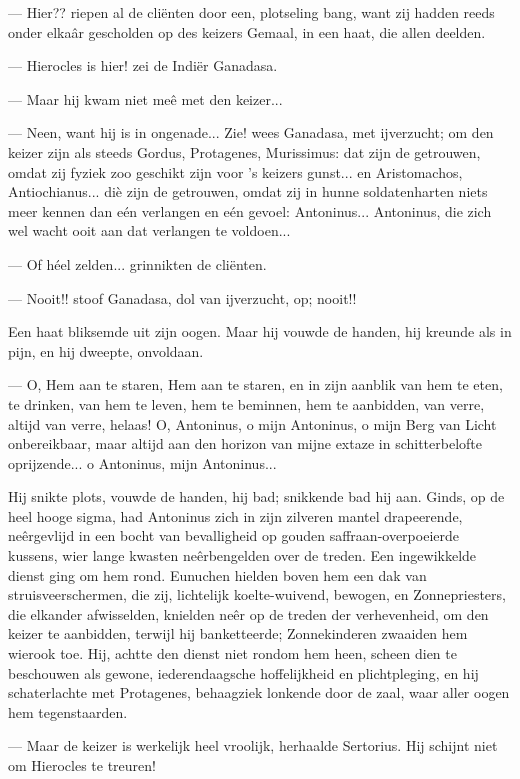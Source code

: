 \documentclass[a4paper, 12pt, oneside, dutch]{article}
\begin{document}
--- Hier?? riepen al de cliënten door een, plotseling bang, want zij hadden reeds onder elkaâr gescholden op des keizers Gemaal, in een haat, die allen deelden.

--- Hierocles is hier! zei de Indiër Ganadasa.

--- Maar hij kwam niet meê met den keizer...

--- Neen, want hij is in ongenade... Zie! wees Ganadasa, met ijverzucht; om den keizer zijn als steeds Gordus, Protagenes, Murissimus: dat zijn de getrouwen, omdat zij fyziek zoo geschikt zijn voor 's keizers gunst... en Aristomachos, Antiochianus... diè zijn de getrouwen, omdat zij in hunne soldatenharten niets meer kennen dan eén verlangen en eén gevoel: Antoninus... Antoninus, die zich wel wacht ooit aan dat verlangen te voldoen...

--- Of héel zelden... grinnikten de cliënten.

--- Nooit!! stoof Ganadasa, dol van ijverzucht, op; nooit!!

Een haat bliksemde uit zijn oogen. Maar hij vouwde de handen, hij kreunde als in pijn, en hij dweepte, onvoldaan.

--- O, Hem aan te staren, Hem aan te staren, en in zijn aanblik van hem te eten, te drinken, van hem te leven, hem te beminnen, hem te aanbidden, van verre, altijd van verre, helaas! O, Antoninus, o mijn Antoninus, o mijn Berg van Licht onbereikbaar, maar altijd aan den horizon van mijne extaze in schitterbelofte oprijzende... o Antoninus, mijn Antoninus...

Hij snikte plots, vouwde de handen, hij bad; snikkende bad hij aan. Ginds, op de heel hooge sigma, had Antoninus zich in zijn zilveren mantel drapeerende, neêrgevlijd in een bocht van bevalligheid op gouden saffraan-overpoeierde kussens, wier lange kwasten neêrbengelden over de treden. Een ingewikkelde dienst ging om hem rond. Eunuchen hielden boven hem een dak van struisveerschermen, die zij, lichtelijk koelte-wuivend, bewogen, en Zonnepriesters, die elkander afwisselden, knielden neêr op de treden der verhevenheid, om den keizer te aanbidden, terwijl hij banketteerde; Zonnekinderen zwaaiden hem wierook toe. Hij, achtte den dienst niet rondom hem heen, scheen dien te beschouwen als gewone, iederendaagsche hoffelijkheid en plichtpleging, en hij schaterlachte met Protagenes, behaagziek lonkende door de zaal, waar aller oogen hem tegenstaarden.

--- Maar de keizer is werkelijk heel vroolijk, herhaalde Sertorius. Hij schijnt niet om Hierocles te treuren!
\end{document}
